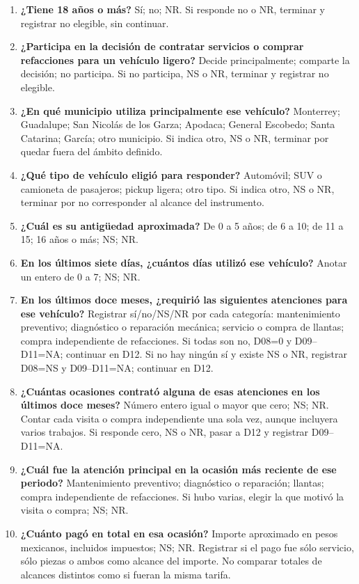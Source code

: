 {\begin{enumerate}
\item[D01.] \textbf{¿Tiene 18 años o más?} Sí; no; NR. Si responde no o NR, terminar y registrar no elegible, sin continuar.
\item[D02.] \textbf{¿Participa en la decisión de contratar servicios o comprar refacciones para un vehículo ligero?} Decide principalmente; comparte la decisión; no participa. Si no participa, NS o NR, terminar y registrar no elegible.
\item[D03.] \textbf{¿En qué municipio utiliza principalmente ese vehículo?} Monterrey; Guadalupe; San Nicolás de los Garza; Apodaca; General Escobedo; Santa Catarina; García; otro municipio. Si indica otro, NS o NR, terminar por quedar fuera del ámbito definido.
\item[D04.] \textbf{¿Qué tipo de vehículo eligió para responder?} Automóvil; SUV o camioneta de pasajeros; pickup ligera; otro tipo. Si indica otro, NS o NR, terminar por no corresponder al alcance del instrumento.
\item[D05.] \textbf{¿Cuál es su antigüedad aproximada?} De 0 a 5 años; de 6 a 10; de 11 a 15; 16 años o más; NS; NR.
\item[D06.] \textbf{En los últimos siete días, ¿cuántos días utilizó ese vehículo?} Anotar un entero de 0 a 7; NS; NR.
\item[D07.] \textbf{En los últimos doce meses, ¿requirió las siguientes atenciones para ese vehículo?} Registrar sí/no/NS/NR por cada categoría: mantenimiento preventivo; diagnóstico o reparación mecánica; servicio o compra de llantas; compra independiente de refacciones. Si todas son no, D08=0 y D09--D11=NA; continuar en D12. Si no hay ningún sí y existe NS o NR, registrar D08=NS y D09--D11=NA; continuar en D12.
\item[D08.] \textbf{¿Cuántas ocasiones contrató alguna de esas atenciones en los últimos doce meses?} Número entero igual o mayor que cero; NS; NR. Contar cada visita o compra independiente una sola vez, aunque incluyera varios trabajos. Si responde cero, NS o NR, pasar a D12 y registrar D09--D11=NA.
\item[D09.] \textbf{¿Cuál fue la atención principal en la ocasión más reciente de ese periodo?} Mantenimiento preventivo; diagnóstico o reparación; llantas; compra independiente de refacciones. Si hubo varias, elegir la que motivó la visita o compra; NS; NR.
\item[D10.] \textbf{¿Cuánto pagó en total en esa ocasión?} Importe aproximado en pesos mexicanos, incluidos impuestos; NS; NR. Registrar si el pago fue sólo servicio, sólo piezas o ambos como alcance del importe. No comparar totales de alcances distintos como si fueran la misma tarifa.

\end{enumerate}}
